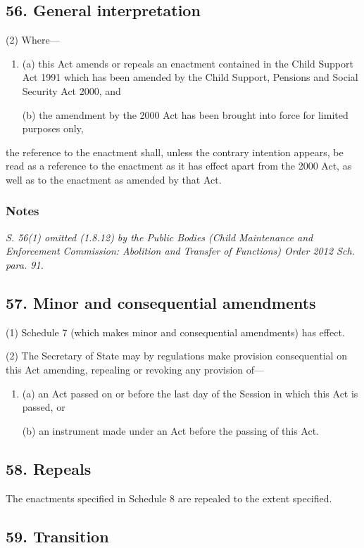 \documentclass[a4paper]{article}
\newcommand\amendment[1]{\subsubsection*{Notes}{\itshape\frenchspacing\footnotesize #1 \par}}
\begin{document}
\subsection{56. General interpretation}


(2) Where—
\begin{enumerate}\item[]
(a) this Act amends or repeals an enactment contained in the Child Support Act 1991 which has been amended by the Child Support, Pensions and Social Security Act 2000, and

(b) the amendment by the 2000 Act has been brought into force for limited purposes only,
\end{enumerate}
the reference to the enactment shall, unless the contrary intention appears, be read as a reference to the enactment as it has effect apart from the 2000 Act, as well as to the enactment as amended by that Act.

\amendment{
S. 56(1) omitted (1.8.12) by the Public Bodies (Child Maintenance and Enforcement Commission: Abolition and Transfer of Functions) Order 2012 Sch. para. 91.
}

\subsection{57. Minor and consequential amendments}

(1) Schedule 7 (which makes minor and consequential amendments) has effect.

(2) The Secretary of State may by regulations make provision consequential on this Act amending, repealing or revoking any provision of—
\begin{enumerate}\item[]
(a) an Act passed on or before the last day of the Session in which this Act is passed, or

(b) an instrument made under an Act before the passing of this Act.
\end{enumerate}

\subsection{58. Repeals}

The enactments specified in Schedule 8 are repealed to the extent specified.

\subsection{59. Transition}
\end{document}
